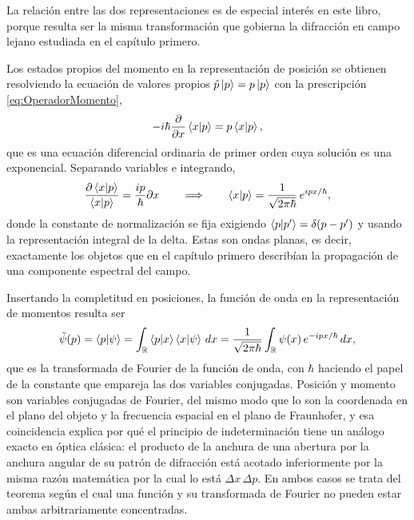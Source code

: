         La relación entre las dos representaciones es de especial interés en este libro, porque resulta ser la misma transformación que gobierna la difracción en campo lejano estudiada en el capítulo primero.

        Los estados propios del momento en la representación de posición se obtienen resolviendo la ecuación de valores propios $\hat{p}\ket{p} = p\ket{p}$ con la prescripción \eqref{eq:OperadorMomento},
        \begin{equation}\label{eq:EcuacionPropiosP}
            -i\hbar\frac{\partial}{\partial x}\braket{x|p} = p\braket{x|p},
        \end{equation}
        que es una ecuación diferencial ordinaria de primer orden cuya solución es una exponencial. Separando variables e integrando,
        \begin{equation}\label{eq:SolucionPropiosP}
            \frac{\partial\braket{x|p}}{\braket{x|p}} = \frac{ip}{\hbar}\partial x
            \qquad\Longrightarrow\qquad
            \braket{x|p} = \frac{1}{\sqrt{2\pi\hbar}}\,e^{ipx/\hbar},
        \end{equation}
        donde la constante de normalización se fija exigiendo $\braket{p|p'} = \delta(p-p')$ y usando la representación integral de la delta. Estas son ondas planas, es decir, exactamente los objetos que en el capítulo primero describían la propagación de una componente espectral del campo.

        Insertando la completitud en posiciones, la función de onda en la representación de momentos resulta ser
        \begin{equation}\label{eq:FourierMomento}
            \tilde{\psi}(p) = \braket{p|\psi} = \int_{\mathbb{R}}\braket{p|x}\braket{x|\psi}\,dx
            = \frac{1}{\sqrt{2\pi\hbar}}\int_{\mathbb{R}}\psi(x)\,e^{-ipx/\hbar}\,dx,
        \end{equation}
        que es la transformada de Fourier de la función de onda, con $\hbar$ haciendo el papel de la constante que empareja las dos variables conjugadas. Posición y momento son variables conjugadas de Fourier, del mismo modo que lo son la coordenada en el plano del objeto y la frecuencia espacial en el plano de Fraunhofer, y esa coincidencia explica por qué el principio de indeterminación tiene un análogo exacto en óptica clásica: el producto de la anchura de una abertura por la anchura angular de su patrón de difracción está acotado inferiormente por la misma razón matemática por la cual lo está $\Delta x\,\Delta p$. En ambos casos se trata del teorema según el cual una función y su transformada de Fourier no pueden estar ambas arbitrariamente concentradas.

